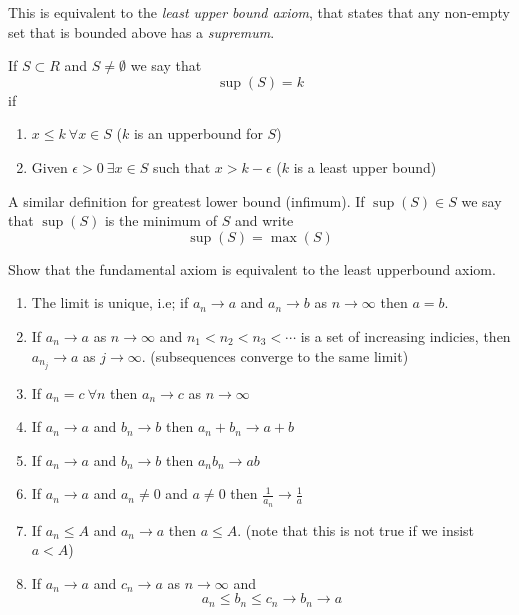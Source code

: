 \documentclass{article}
\numberwithin{equation}{section}
\begin{document}
This is equivalent to the \emph{least upper bound axiom}, that states that any non-empty set that is bounded above has a \emph{supremum}.
\begin{defi}[Supremum]
    If $S \subset R$ and $S \neq \emptyset$ we say that
    \[\sup(S) = k\]
    if 
    \begin{enumerate}
        \item $x \leq k \ \forall x \in S$ ($k$ is an upperbound for $S$)
        \item Given $\epsilon > 0 \ \exists x \in S$ such that $x > k - \epsilon$ ($k$ is a least upper bound)
    \end{enumerate}
\end{defi}

A similar definition for greatest lower bound (infimum). 
If $\sup(S) \in S$ we say that $\sup(S)$ is the minimum of $S$ and write
\[\sup(S) = \max(S)\]

\begin{ex}
    Show that the fundamental axiom is equivalent to the least upperbound axiom.
\end{ex}

\begin{nlemma}\leavevmode
    \begin{enumerate}
        \item The limit is unique, i.e; if $a_n \rightarrow a$ and $a_n \rightarrow b$ as $n \rightarrow \infty$ then $a = b$.
        \item If $a_n \rightarrow a$ as $n \rightarrow \infty$ and $n_1 < n_2 < n_3 < \cdots$ is a set of increasing indicies, 
        then $a_{n_j} \rightarrow a$ as $j \rightarrow \infty$. (subsequences converge to the same limit)
        \item If $a_n = c \ \forall n$ then $a_n \rightarrow c$ as $n \rightarrow \infty$
        \item If $a_n \rightarrow a$ and $b_n \rightarrow b$ then $a_n + b_n \rightarrow a + b$ 
        \item If $a_n \rightarrow a$ and $b_n \rightarrow b$ then $a_nb_n \rightarrow ab$
        \item If $a_n \rightarrow a$ and $a_n \neq 0$ and $a \neq 0$ then $\frac{1}{a_n} \rightarrow \frac{1}{a}$
        \item If $a_n \leq A$ and $a_n \rightarrow a$ then $a \leq A$. (note that this is not true if we insist $a < A$)
        \item If $a_n \rightarrow a$ and $c_n \rightarrow a$ as $n \rightarrow \infty$ and
        \[a_n \leq b_n \leq c_n \rightarrow b_n \rightarrow a\]
    \end{enumerate}
\end{nlemma}
\end{document}
